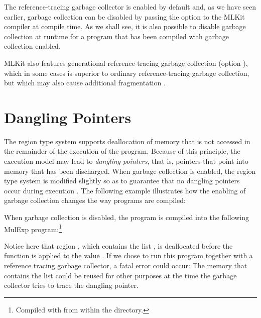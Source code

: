 \documentclass[12pt]{book}
\begin{document}
The reference-tracing garbage collector is enabled by default and, as we have
seen earlier, garbage collection can be disabled by passing the 
option to the MLKit compiler at compile time. As we shall see, it is also
possible to disable garbage collection at runtime for a program that has been
compiled with garbage collection enabled.

MLKit also features generational reference-tracing garbage collection
(option ), which in some cases is superior to ordinary
reference-tracing garbage collection, but which may also cause additional
fragmentation \cite{elshaljfp21}.

\section{Dangling Pointers}
The region type system supports deallocation of memory that is not accessed in
the remainder of the execution of the program. Because of this principle, the
execution model may lead to {\em dangling pointers}, that is, pointers that
point into memory that has been discharged. When garbage collection is enabled,
the region type system is modified slightly so as to guarantee that no dangling
pointers occur during execution \cite{elsman:tldi03,10.1145/3591229}. The
following example illustrates how the enabling of garbage collection changes the
way programs are compiled:
When garbage collection is disabled, the program is compiled into the following
MulExp program:\footnote{Compiled with  from within the
 directory.}
Notice here that region , which contains the list \kw{[1]}, is
deallocated before the function  is applied to the value . If we
chose to run this program together with a reference tracing garbage collector, a
fatal error could occur: The memory that contains the list \kw{[1]} could be
reused for other purposes at the time the garbage collector tries to trace the
dangling pointer.
\end{document}
